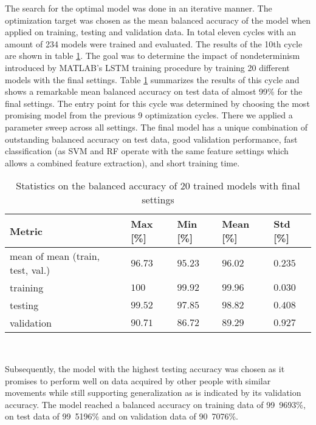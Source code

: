 The search for the optimal model was done in an iterative manner. The optimization target was chosen as the mean balanced accuracy of the model when applied on training, testing and validation data. In total eleven cycles with an amount of 234 models were trained and evaluated. The results of the 10th cycle are shown in table \ref{tbl:opt_process}. The goal was to determine the impact of nondeterminism introduced by MATLAB's LSTM training procedure by training 20 different models with the final settings. Table \ref{tbl:opt_process} summarizes the results of this cycle and shows a remarkable mean balanced accuracy on test data of almost \unit{99}{\%} for the final settings.
The entry point for this cycle was determined by choosing the most promising model from the previous 9 optimization cycles. There we applied a parameter sweep across all settings.
The final model has a unique combination of outstanding balanced accuracy on test data, good validation performance, fast classification (as \ac{SVM} and \ac{RF} operate with the same feature settings which allows a combined feature extraction), and short training time.
 
\begin{table}[h]
     \centering
     \caption{Statistics on the balanced accuracy of 20 trained models with final settings}
     \begin{tabular}[h]{p{2cm}||p{1cm}|p{1cm}|p{1cm}|p{1cm}}
     Metric & Max [\%]& Min [\%]& Mean [\%]& Std [\%] \\
     \hline
     mean of mean (train, test, val.) &$96.73$&$95.23$&$96.02$&$0.235$\\
     training &$100$&$99.92$&$99.96$&$0.030$\\
     testing &$99.52$&$97.85$&$98.82$&$0.408$\\
     validation &$90.71$&$86.72$&$89.29$&$0.927$  \\
     \end{tabular}
	\\
     \label{tbl:opt_process}
   \end{table}

Subsequently, the model with the highest testing accuracy was chosen as it promises to perform well on data acquired by other people with similar movements while still supporting generalization as is indicated by its validation accuracy. The model reached a balanced accuracy on training data of \unit{99.9693}{\%}, on test data of \unit{99.5196}{\%} and on validation data of \unit{90.7076}{\%}.

